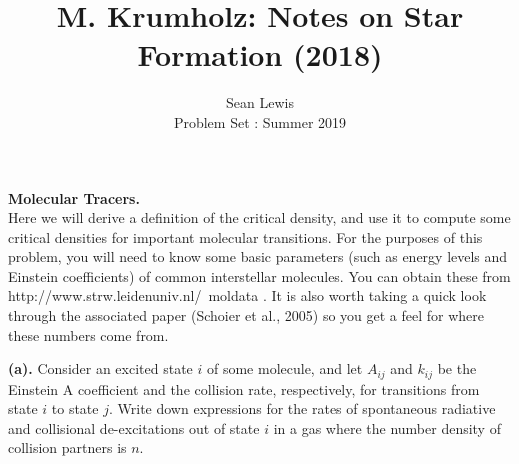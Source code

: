 \documentclass[10pt]{article}
\newenvironment{problem}[2][Problem]{\begin{trivlist}
\item[\hskip \labelsep {\bfseries #1}\hskip \labelsep {\bfseries #2.}]}{\end{trivlist}}
\begin{document}
 
\title{M. Krumholz: Notes on Star Formation (2018)}
\author{Sean Lewis\\
Problem Set : Summer 2019}
\maketitle
 
\begin{problem}{1.1}
\textbf{Molecular Tracers.}\\
Here we will derive a definition of the critical density, and use it to compute some critical densities for important molecular transitions. For the purposes of this problem, you will need to know some basic parameters (such as energy levels and Einstein coefficients) of common interstellar molecules. You can obtain these from http://www.strw.leidenuniv.nl/~moldata . It is also worth taking a quick look through the associated paper (Schoier et al., 2005) so you get a feel for where these numbers come from.
\end{problem}
\textbf{(a).} Consider an excited state $i$ of some molecule, and let $A_{ij}$ and $k_{ij}$ be the Einstein A coefficient and the collision rate, respectively, for transitions from state $i$ to state $j$. Write down expressions for the rates of spontaneous radiative and collisional de-excitations out of state $i$ in a gas where the number density of collision partners is $n$.
\end{document}
